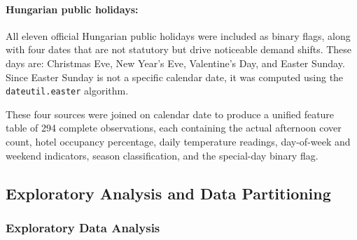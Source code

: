 \documentclass[12pt,a4paper,oneside]{article}
\begin{document}
\paragraph{Hungarian public holidays:} All eleven official Hungarian public holidays were included as binary flags, along with four dates that are not statutory but drive noticeable demand shifts. These days are: Christmas Eve, New Year's Eve, Valentine's Day, and Easter Sunday. Since Easter Sunday is not a specific calendar date, it was computed using the \texttt{dateutil.easter} algorithm.

These four sources were joined on calendar date to produce a unified feature table of 294 complete observations, each containing the actual afternoon cover count, hotel occupancy percentage, daily temperature readings, day-of-week and weekend indicators, season classification, and the special-day binary flag.


\begin{table}[H]
\centering
\small
\renewcommand{\arraystretch}{1.3}
\renewcommand{\arraystretch}{1}
\caption{First five rows of the unified feature table ($n = 294$).}
\label{tab:featurehead}
\end{table}

\subsection{Exploratory Analysis and Data Partitioning}

\subsubsection{Exploratory Data Analysis}
\label{sec:eda}
\end{document}
